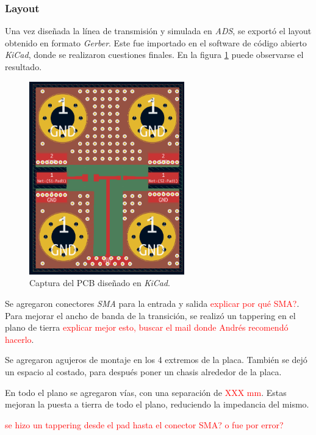 \subsubsection{Layout}

Una vez diseñada la línea de transmisión y simulada en \textit{ADS}, se exportó
el layout obtenido en formato \textit{Gerber}. Este fue importado en el software
de código abierto \textit{KiCad}, donde se realizaron cuestiones finales. En la
figura \ref{fig:pulser_layout} puede observarse el resultado.

\begin{figure}[tbp]
    \centering
    \includegraphics[width=0.6\textwidth]{images/pulser_layout.png}
    \caption{Captura del PCB diseñado en \textit{KiCad}.}
    \label{fig:pulser_layout}
\end{figure}

Se agregaron conectores \textit{SMA} para la entrada y salida
\textcolor{red}{explicar por qué SMA?}. Para mejorar el ancho de banda de la
transición, se realizó un tappering en el plano de tierra
\textcolor{red}{explicar mejor esto, buscar el mail donde Andrés recomendó
hacerlo}.

Se agregaron agujeros de montaje en los 4 extremos de la placa. También se dejó
un espacio al costado, para después poner un chasis alrededor de la placa.

En todo el plano se agregaron vías, con una separación de \textcolor{red}{XXX
mm}. Estas mejoran la puesta a tierra de todo el plano, reduciendo la impedancia
del mismo.

\textcolor{red}{se hizo un tappering desde el pad hasta el conector SMA? o fue
por error?}

